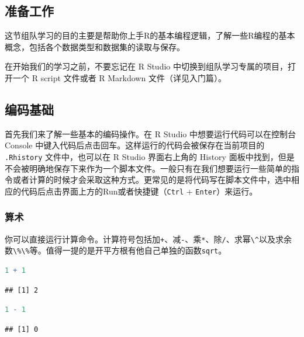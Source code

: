 \documentclass[]{ctexbook}
\newcommand{\passthrough}[1]{#1}
\begin{document}
\hypertarget{ux51c6ux5907ux5de5ux4f5c}{%
\subsection{准备工作}\label{ux51c6ux5907ux5de5ux4f5c}}

这节组队学习的目的主要是帮助你上手R的基本编程逻辑，了解一些R编程的基本概念，包括各个数据类型和数据集的读取与保存。

在开始我们的学习之前，不要忘记在 R Studio 中切换到组队学习专属的项目，打开一个 R script 文件或者 R Markdown 文件（详见入门篇）。

\hypertarget{ux7f16ux7801ux57faux7840}{%
\subsection{编码基础}\label{ux7f16ux7801ux57faux7840}}

首先我们来了解一些基本的编码操作。在 R Studio 中想要运行代码可以在控制台 Console 中键入代码后点击回车。这样运行的代码会被保存在当前项目的 \passthrough{\lstinline!.Rhistory!} 文件中，也可以在 R Studio 界面右上角的 History 面板中找到，但是不会被明确地保存下来作为一个脚本文件。一般只有在我们想要运行一些简单的指令或者计算的时候才会采取这种方式。更常见的是将代码写在脚本文件中，选中相应的代码后点击界面上方的Run或者快捷键（\passthrough{\lstinline!Ctrl!} + \passthrough{\lstinline!Enter!}）来运行。

\hypertarget{ux7b97ux672f}{%
\subsubsection{算术}\label{ux7b97ux672f}}

你可以直接运行计算命令。计算符号包括加\passthrough{\lstinline!+!}、减\passthrough{\lstinline!-!}、乘\passthrough{\lstinline!*!}、除\passthrough{\lstinline!/!}、求幂\passthrough{\lstinline!\^!}以及求余数\passthrough{\lstinline!\%\%!}等。值得一提的是开平方根有他自己单独的函数\passthrough{\lstinline!sqrt!}。

\begin{lstlisting}[language=R]
1 + 1
\end{lstlisting}

\begin{lstlisting}
## [1] 2
\end{lstlisting}

\begin{lstlisting}[language=R]
1 - 1
\end{lstlisting}

\begin{lstlisting}
## [1] 0
\end{lstlisting}
\end{document}
